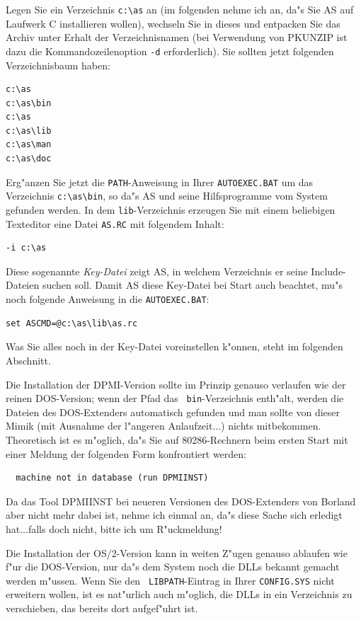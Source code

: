 \documentclass[12pt,a4paper,twoside]{report}
\newcommand{\tty}[1]{{\tt #1}}
\newcommand{\asname}{AS}
\begin{document}
Legen Sie ein Verzeichnis \verb!c:\as! an (im folgenden nehme ich an,
da"s Sie \asname{} auf Laufwerk C installieren wollen), wechseln Sie in dieses
und entpacken Sie das Archiv unter Erhalt der Verzeichnisnamen (bei
Verwendung von PKUNZIP ist dazu die Kommandozeilenoption \verb!-d!
erforderlich).  Sie sollten jetzt folgenden Verzeichnisbaum haben:
\begin{verbatim}
c:\as
c:\as\bin
c:\as
c:\as\lib
c:\as\man
c:\as\doc
\end{verbatim}
Erg"anzen Sie jetzt die \tty{PATH}-Anweisung in Ihrer \tty{AUTOEXEC.BAT}
um das Verzeichnis \verb!c:\as\bin!, so da"s \asname{} und seine Hilfsprogramme
vom System gefunden werden.  In dem \tty{lib}-Verzeichnis erzeugen Sie
mit einem beliebigen Texteditor eine Datei \tty{AS.RC} mit folgendem
Inhalt:
\begin{verbatim}
-i c:\as
\end{verbatim}
Diese sogenannte {\em Key-Datei} zeigt \asname{}, in welchem Verzeichnis er seine
Include-Dateien suchen soll.  Damit \asname{} diese Key-Datei bei Start
auch beachtet, mu"s noch folgende Anweisung in die \tty{AUTOEXEC.BAT}:
\begin{verbatim}
set ASCMD=@c:\as\lib\as.rc
\end{verbatim}
Was Sie alles noch in der Key-Datei voreinstellen k"onnen, steht im
folgenden Abschnitt.

Die Installation der DPMI-Version  sollte im Prinzip
genauso verlaufen wie der reinen DOS-Version; wenn der Pfad das {\tt
bin}-Verzeichnis enth"alt, werden die Dateien des DOS-Extenders
automatisch gefunden und man sollte von dieser Mimik (mit Ausnahme der
l"angeren Anlaufzeit...) nichts mitbekommen.  Theoretisch ist es m"oglich,
da"s Sie auf 80286-Rechnern beim ersten Start mit einer Meldung der
folgenden Form konfrontiert werden:
\begin{verbatim}
  machine not in database (run DPMIINST)
\end{verbatim}
Da das Tool DPMIINST bei neueren Versionen des DOS-Extenders von Borland
aber nicht mehr dabei ist, nehme ich einmal an, da"s diese Sache sich
erledigt hat...falls doch nicht, bitte ich um R"uckmeldung!

Die Installation der OS/2-Version  kann in weiten
Z"ugen genauso ablaufen wie f"ur die DOS-Version, nur da"s dem System noch
die DLLs bekannt gemacht werden m"ussen.  Wenn Sie den {\tt
LIBPATH}-Eintrag in Ihrer {\tt CONFIG.SYS} nicht erweitern wollen, ist es
nat"urlich auch m"oglich, die DLLs in ein Verzeichnis zu verschieben, das
bereits dort aufgef"uhrt ist.
\end{document}
